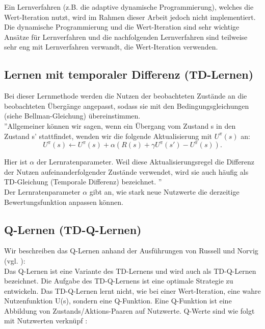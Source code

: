 Ein Lernverfahren (z.B. die adaptive dynamische Programmierung), welches die Wert-Iteration nutzt, wird im Rahmen dieser Arbeit jedoch nicht implementiert. Die dynamische Programmierung und die Wert-Iteration sind sehr wichtige Ansätze für Lernverfahren und die nachfolgenden Lernverfahren sind teilweise sehr eng mit Lernverfahren verwandt, die Wert-Iteration verwenden. \\

\subsection{Lernen mit temporaler Differenz (TD-Lernen)}
\label{subsec:Lernen mit temporaler Differenz}
Bei dieser Lernmethode werden die Nutzen der beobachteten Zustände an die beobachteten Übergänge angepasst, sodass sie mit den Bedingungsgleichungen (siehe Bellman-Gleichung) übereinstimmen. \\

''Allgemeiner können wir sagen, wenn ein Übergang vom Zustand s in den Zustand s' stattfindet, wenden wir die folgende Aktualisierung mit $U^\pi(s)$ an:\\
\begin{equation}
\label{eq:Aktualisierungsgleichung temporale Differenz}
U^\pi(s) \leftarrow U^\pi(s) + \alpha(R(s) + \gamma U^\pi(s') - U^\pi(s)).
\end{equation}

Hier ist $\alpha$ der Lernratenparameter. Weil diese Aktualisierungsregel die Differenz der Nutzen aufeinanderfolgender Zustände verwendet, wird sie auch häufig als TD-Gleichung (Temporale Differenz) bezeichnet. \cite[966\psq]{Russell}'' \\ 

Der Lernratenparameter $\alpha$ gibt an, wie stark neue Nutzwerte die derzeitige Bewertungsfunktion anpassen können. 

\subsection{Q-Lernen (TD-Q-Lernen)}
\label{subsec:Q-Lernen}
Wir beschreiben das Q-Lernen anhand der Ausführungen von Russell und Norvig (vgl. \cite[973 \psq]{Russell}): \\

Das Q-Lernen ist eine Variante des TD-Lernens und wird auch als TD-Q-Lernen bezeichnet. Die Aufgabe des TD-Q-Lernens ist eine optimale Strategie zu entwickeln. Das TD-Q-Lernen lernt nicht, wie bei einer Wert-Iteration, eine wahre Nutzenfunktion U(s), sondern eine Q-Funktion. Eine Q-Funktion ist eine Abbildung von Zustands/Aktions-Paaren auf Nutzwerte. Q-Werte sind wie folgt mit Nutzwerten verknüpf \cite[974]{Russell}:

